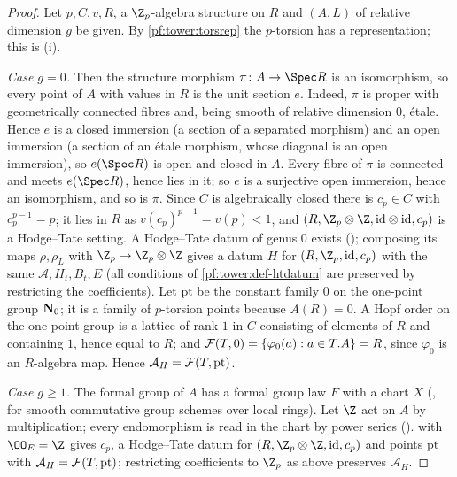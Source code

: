 \begin{proof}
Let $p,C,v,R$, a $\Z_p$-algebra structure on $R$ and $(A,L)$ of relative dimension $g$ be given. By
\cref{pf:tower:torsrep} the $p$-torsion has a representation; this is (i).

\emph{Case $g=0$.} Then the structure morphism $\pi\colon A\to\Spec R$ is an isomorphism, so every point of $A$ with
values in $R$ is the unit section $e$. Indeed, $\pi$ is proper with geometrically connected fibres and, being smooth of
relative dimension $0$, \'etale. Hence $e$ is a closed immersion (a section of a separated morphism) and an open
immersion (a section of an \'etale morphism, whose diagonal is an open immersion), so $e(\Spec R)$ is open and closed in
$A$. Every fibre of $\pi$ is connected and meets $e(\Spec R)$, hence lies in it; so $e$ is a surjective open immersion,
hence an isomorphism, and so is $\pi$. Since $C$ is algebraically closed there is $c_p\in C$ with
$c_p^{p-1}=p$; it lies in $R$ as $v(c_p)^{p-1}=v(p)<1$, and $(R,\Z_p\otimes\Z,\mathrm{id}\otimes\mathrm{id},c_p)$ is a
Hodge--Tate setting. A Hodge--Tate datum of genus $0$ exists (); composing its
maps $\rho,\rho_L$ with $\Z_p\to\Z_p\otimes\Z$ gives a datum $H$ for $(R,\Z_p,\mathrm{id},c_p)$ with the same
$\mathcal A,H_t,B_t,E$ (all conditions of \cref{pf:tower:def-htdatum} are preserved by restricting the coefficients). Let
$\mathrm{pt}$ be the constant family $0$ on the one-point group $\mathbf N_0$; it is a family of $p$-torsion points because
$A(R)=0$. A Hopf order on the one-point group is a lattice of rank $1$ in $C$ consisting of elements of $R$ and containing
$1$, hence equal to $R$; and $\mathcal F(T,0)=\{\varphi_0(a):a\in T.A\}=R$, since $\varphi_0$ is an $R$-algebra map. Hence
$\mathcal A_H=\mathcal F(T,\mathrm{pt})$.

\emph{Case $g\ge1$.} The formal group of $A$ has a formal group law $F$ with a chart $X$
(, for smooth commutative group schemes over local rings). Let $\Z$
act on $A$ by multiplication; every endomorphism is read in the chart by power series
().  with $\OO_E=\Z$ gives $c_p$, a Hodge--Tate datum for
$(R,\Z_p\otimes\Z,\mathrm{id},c_p)$ and points $\mathrm{pt}$ with $\mathcal A_H=\mathcal F(T,\mathrm{pt})$; restricting
coefficients to $\Z_p$ as above preserves $\mathcal A_H$.
\end{proof}

